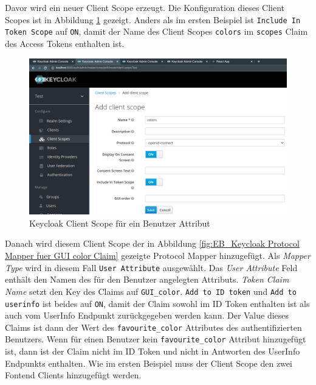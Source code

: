 Davor wird ein neuer Client Scope erzeugt. Die Konfiguration dieses Client Scopes ist in Abbildung \ref{fig:EB_Keycloak Client Scope für User Attribut} gezeigt. Anders als im ersten Beispiel ist \texttt{Include In Token Scope} auf \texttt{ON}, damit der Name des Client Scopes \texttt{colors} im \texttt{scopes} Claim des Access Tokens enthalten ist.

\begin{figure}[!ht]
	\centering
	\includegraphics[width=1\textwidth]{Images/EbertScherer/KeycloakNewUserAttributeClientScope.PNG}
	\caption{Keycloak Client Scope für ein Benutzer Attribut}
	\label{fig:EB_Keycloak Client Scope für User Attribut}
\end{figure}

Danach wird diesem Client Scope der in Abbildung \ref{fig:EB_Keycloak Protocol Mapper fuer GUI color Claim} gezeigte Protocol Mapper hinzugefügt. Als \textit{Mapper Type} wird in diesem Fall \texttt{User Attribute} ausgewählt. Das \textit{User Attribute} Feld enthält den Namen des für den Benutzer angelegten Attributs. \textit{Token Claim Name} setzt den Key des Claims auf \texttt{GUI\_color}. \texttt{Add to ID token} und \texttt{Add to userinfo} ist beides auf \texttt{ON}, damit der Claim sowohl im ID Token enthalten ist als auch vom UserInfo Endpunkt zurückgegeben werden kann. Der Value dieses Claims ist dann der Wert des \texttt{favourite\_color} Attributes des authentifizierten Benutzers. Wenn für einen Benutzer kein \texttt{favourite\_color} Attribut hinzugefügt ist, dann ist der Claim nicht im ID Token und nicht in Antworten des UserInfo Endpunkts enthalten. Wie im ersten Beispiel muss der Client Scope den zwei Fontend Clients hinzugefügt werden.

